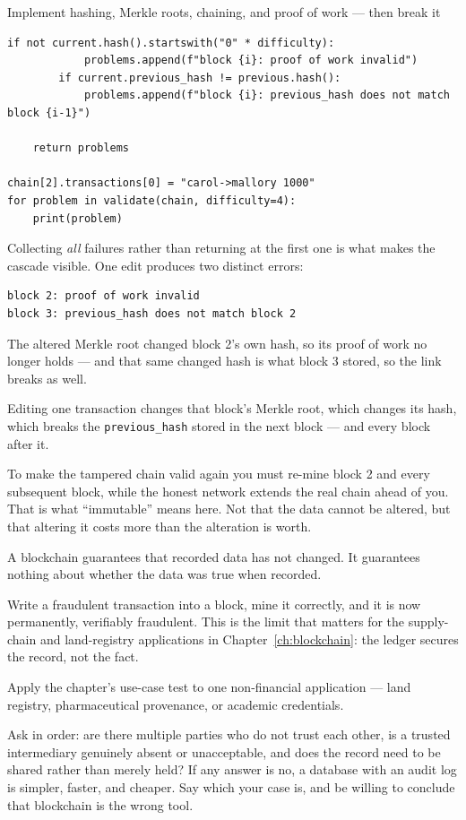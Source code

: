 \begin{labproject}{Implement hashing, Merkle roots, chaining, and proof of work --- then break it}
\begin{lstlisting}[style=utppython]
        if not current.hash().startswith("0" * difficulty):
            problems.append(f"block {i}: proof of work invalid")
        if current.previous_hash != previous.hash():
            problems.append(f"block {i}: previous_hash does not match block {i-1}")

    return problems

chain[2].transactions[0] = "carol->mallory 1000"
for problem in validate(chain, difficulty=4):
    print(problem)
\end{lstlisting}

Collecting \emph{all} failures rather than returning at the first one is what makes the cascade visible. One edit produces two distinct errors:

\begin{lstlisting}[style=utpterminal]
block 2: proof of work invalid
block 3: previous_hash does not match block 2
\end{lstlisting}

The altered Merkle root changed block 2's own hash, so its proof of work no longer holds --- and that same changed hash is what block 3 stored, so the link breaks as well.

\begin{keyidea}
Editing one transaction changes that block's Merkle root, which changes its hash, which breaks the \texttt{previous\_hash} stored in the next block --- and every block after it.

To make the tampered chain valid again you must re-mine block 2 and every subsequent block, while the honest network extends the real chain ahead of you. That is what ``immutable'' means here. Not that the data cannot be altered, but that altering it costs more than the alteration is worth.
\end{keyidea}

\begin{pitfall}
A blockchain guarantees that recorded data has not changed. It guarantees nothing about whether the data was true when recorded.

Write a fraudulent transaction into a block, mine it correctly, and it is now permanently, verifiably fraudulent. This is the limit that matters for the supply-chain and land-registry applications in Chapter~\ref{ch:blockchain}: the ledger secures the record, not the fact.
\end{pitfall}

\begin{tryit}
Apply the chapter's use-case test to one non-financial application --- land registry, pharmaceutical provenance, or academic credentials.

Ask in order: are there multiple parties who do not trust each other, is a trusted intermediary genuinely absent or unacceptable, and does the record need to be shared rather than merely held? If any answer is no, a database with an audit log is simpler, faster, and cheaper. Say which your case is, and be willing to conclude that blockchain is the wrong tool.
\end{tryit}
\end{labproject}

